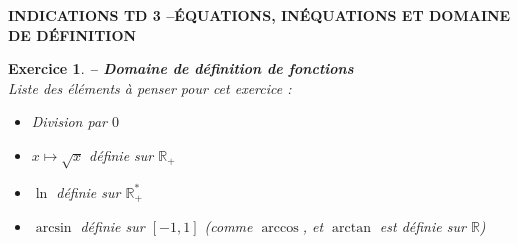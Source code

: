 \documentclass[a4paper,11pt]{article}
\newtheorem{exo}{Exercice}
\newenvironment{exercice}{\begin{exo} \em}{\end{exo}}
\begin{document}



\begin{center}
{\bf INDICATIONS TD 3 \quad--\quad \'EQUATIONS, IN\'EQUATIONS ET DOMAINE DE 
D\'EFINITION}
\end{center}
\bigskip 

\addtocounter{exo}{14}

\begin{exercice} {\bf -- Domaine de d\'efinition de fonctions}
\label{TD6-domaine}\\ 
Liste des éléments à penser pour cet exercice : 
\begin{itemize}
\item Division par $0$
\item $x \mapsto \sqrt{x}$ définie sur $\mathbb{R}_+$
\item $\ln$ définie sur $\mathbb{R}_+^*$
\item $\arcsin$ définie sur $[-1,1]$ (comme $\arccos$, et $\arctan$ est définie sur $\mathbb{R}$)
\end{itemize}
\end{exercice}
\end{document}
